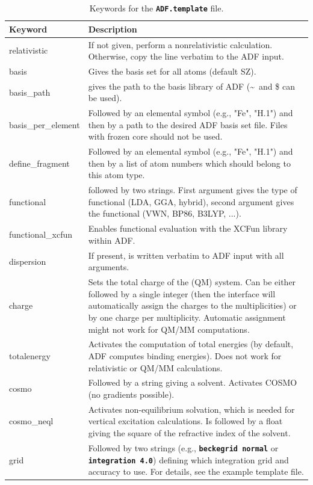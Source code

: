 \documentclass[a4paper,10pt,DIV=15,openany,twoside=false]{scrbook}
\newcommand{\ttt}[1]{\textbf{\texttt{#1}}}
\begin{document}
\begin{table}
  \centering
  \caption{Keywords for the \ttt{ADF.template} file.}
  \label{tab:adf_temp}
  \small
  \begin{tabular}{>{\ttfamily}lp{12cm}}
  \toprule
  Keyword       &Description\\
  \midrule
relativistic            &If not given, perform a nonrelativistic calculation. Otherwise, copy the line verbatim to the ADF input.
\\
basis                   &Gives the basis set for all atoms (default SZ).
\\
basis\_path             &gives the path to the basis library of ADF (\textasciitilde\ and \$ can be used).
\\
basis\_per\_element     &Followed by an elemental symbol (e.g., "Fe", "H.1") and then by a path to the desired ADF basis set file. Files with frozen core should not be used.
\\
define\_fragment        &Followed by an elemental symbol (e.g., "Fe", "H.1") and then by a list of atom numbers which should belong to this atom type.
\\
functional              &followed by two strings. First argument gives the type of functional (LDA, GGA, hybrid), second argument gives the functional (VWN, BP86, B3LYP, ...).
\\
functional\_xcfun       &Enables functional evaluation with the XCFun library within ADF.
\\
dispersion              &If present, is written verbatim to ADF input with all arguments.
\\
charge                  &Sets the total charge of the (QM) system. Can be either followed by a single integer (then the interface will automatically assign the charges to the multiplicities) or by one charge per multiplicity. Automatic assignment might not work for QM/MM computations.
\\
totalenergy             &Activates the computation of total energies (by default, ADF computes binding energies). Does not work for relativistic or QM/MM calculations.
\\
cosmo                   &Followed by a string giving a solvent. Activates COSMO (no gradients possible).
\\
cosmo\_neql             &Activates non-equilibrium solvation, which is needed for vertical excitation calculations. Is followed by a float giving the square of the refractive index of the solvent.
\\
grid                    &Followed by two strings (e.g., \ttt{beckegrid normal} or \ttt{integration 4.0}) defining which integration grid and accuracy to use. For details, see the example template file.

\end{tabular}
\end{table}
\end{document}
